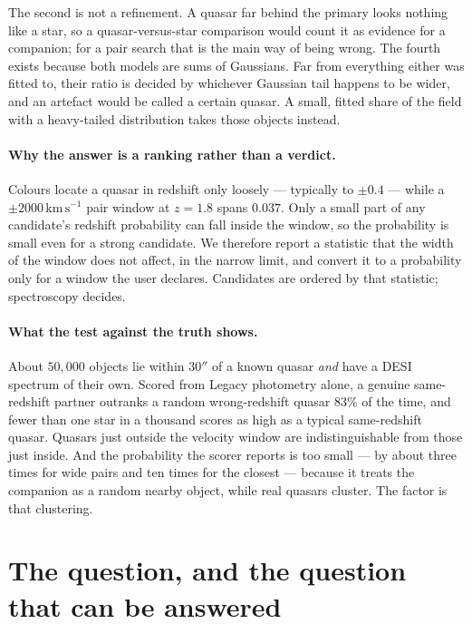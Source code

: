 \documentclass[11pt,a4paper]{article}
\newcommand{\kms}{\,\mathrm{km\,s^{-1}}}
\begin{document}
The second is not a refinement. A quasar far behind the primary looks nothing
like a star, so a quasar-versus-star comparison would count it as evidence for a
companion; for a pair search that is the main way of being wrong. The fourth
exists because both models are sums of Gaussians. Far from everything either
was fitted to, their ratio is decided by whichever Gaussian tail happens to be
wider, and an artefact would be called a certain quasar. A small, fitted share
of the field with a heavy-tailed distribution takes those objects instead.

\paragraph{Why the answer is a ranking rather than a verdict.} Colours locate a
quasar in redshift only loosely --- typically to $\pm0.4$ --- while a
$\pm2000\kms$ pair window at $z=1.8$ spans $0.037$. Only a small part of any
candidate's redshift probability can fall inside the window, so the probability
is small even for a strong candidate. We therefore report a statistic that the
width of the window does not affect, in the narrow limit, and convert it to a
probability only for a window the user declares. Candidates are ordered by that
statistic; spectroscopy decides.

\paragraph{What the test against the truth shows.} About $50{,}000$ objects lie
within $30''$ of a known quasar \emph{and} have a DESI spectrum of their own.
Scored from Legacy photometry alone, a genuine same-redshift partner outranks a
random wrong-redshift quasar $83\%$ of the time, and fewer than one star in a
thousand scores as high as a typical same-redshift quasar.
Quasars just outside the velocity window are indistinguishable from those just
inside. And the probability the scorer reports is too small --- by about three
times for wide pairs and ten times for the closest --- because it treats the
companion as a random nearby object, while real quasars cluster. The factor is
that clustering.

\clearpage
\section{The question, and the question that can be answered}
\label{sec:question}
\end{document}
